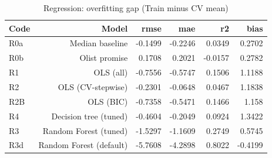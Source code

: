 \begin{table}[htbp]
\centering
\small
\caption{Regression: overfitting gap (Train minus CV mean)}
\begin{tabular}{lrrrrr}
\toprule
Code & Model & rmse & mae & r2 & bias \\
\midrule
R0a & Median baseline & -0.1499 & -0.2246 & 0.0349 & 0.2702 \\
R0b & Olist promise & 0.1708 & 0.2021 & -0.0157 & 0.2782 \\
R1 & OLS (all) & -0.7556 & -0.5747 & 0.1506 & 1.1188 \\
R2 & OLS (CV-stepwise) & -0.2301 & -0.0648 & 0.0467 & 1.1838 \\
R2B & OLS (BIC) & -0.7358 & -0.5471 & 0.1466 & 1.158 \\
R4 & Decision tree (tuned) & -0.4604 & -0.2049 & 0.0924 & 1.3422 \\
R3 & Random Forest (tuned) & -1.5297 & -1.1609 & 0.2749 & 0.5745 \\
R3d & Random Forest (default) & -5.7608 & -4.2898 & 0.8022 & -0.4199 \\
\bottomrule
\end{tabular}
\par\smallskip\begin{minipage}{\linewidth}\footnotesize \end{minipage}
\end{table}

